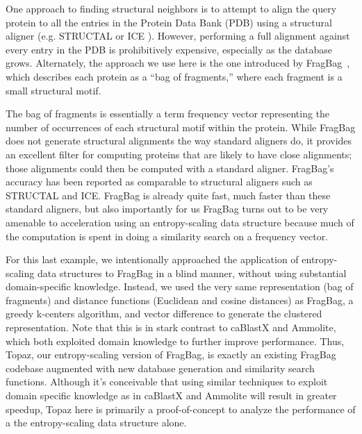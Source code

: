 \documentclass[review,preprint,12pt]{elsarticle}
\renewcommand{\cite}{\citep} %
\theoremstyle{definition}
\theoremstyle{remark}
\numberwithin{equation}{section}
\begin{document}
One approach to finding structural neighbors is to attempt to align the query protein to all the entries in the Protein Data Bank (PDB) using a structural aligner (e.g. STRUCTAL \cite{subbiah1993structural} or ICE \cite{shindyalov1998protein}).
However, performing a full alignment against every entry in the PDB is prohibitively expensive, especially as the database grows.
Alternately, the approach we use here is the one introduced by FragBag~\cite{budowski2010fragbag}, which describes each protein as a
``bag of fragments,'' where each fragment is a small structural motif.

The bag of fragments is essentially
a term frequency vector representing the number of occurrences of each structural motif within the protein.
While FragBag does not generate structural alignments the way standard aligners do, it provides an excellent
filter for computing proteins that are likely to have close alignments; those alignments could then be computed
with a standard aligner.
FragBag's accuracy has been reported as comparable to structural aligners such as STRUCTAL and
ICE.
FragBag is already quite fast, much faster than these standard aligners, but also importantly for us
FragBag turns out to be very amenable to acceleration using an entropy-scaling data structure because much of the computation is spent in doing a similarity search on a frequency vector.

For this last example, we intentionally approached the application of entropy-scaling data structures to FragBag in a blind manner,
without using substantial domain-specific knowledge.
Instead, we used the very same representation (bag of fragments) and distance functions (Euclidean and cosine distances)
as FragBag, a greedy k-centers algorithm, and vector difference to generate the clustered representation.
Note that this is in stark contrast to caBlastX and Ammolite, which both exploited domain knowledge to further improve performance.
Thus, Topaz, our entropy-scaling version of FragBag, is exactly an existing FragBag codebase augmented with new database generation and similarity search functions.
Although it's conceivable that using similar techniques to exploit domain specific knowledge as in caBlastX and Ammolite will result in greater speedup, Topaz here is primarily a proof-of-concept to analyze the performance of a the entropy-scaling data structure alone.
\end{document}
